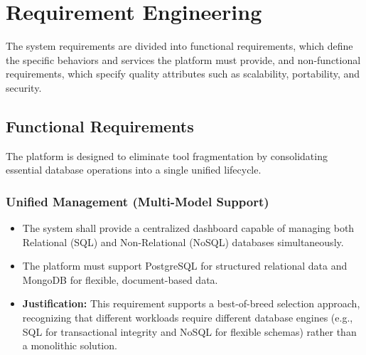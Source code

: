 \section{Requirement Engineering}

The system requirements are divided into functional requirements, which define the specific behaviors and services the platform must provide, and non-functional requirements, which specify quality attributes such as scalability, portability, and security.

\subsection{Functional Requirements}

The platform is designed to eliminate tool fragmentation by consolidating essential database operations into a single unified lifecycle.

\subsubsection*{Unified Management (Multi-Model Support)}
\begin{itemize}
    \item The system shall provide a centralized dashboard capable of managing both Relational (SQL) and Non-Relational (NoSQL) databases simultaneously.
    \item The platform must support PostgreSQL for structured relational data and MongoDB for flexible, document-based data.
    \item \textbf{Justification:} This requirement supports a best-of-breed selection approach, recognizing that different workloads require different database engines (e.g., SQL for transactional integrity and NoSQL for flexible schemas) rather than a monolithic solution.
\end{itemize}

